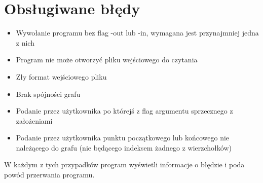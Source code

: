 \documentclass[polish, 12pt, a4paper]{article}
\begin{document}
\section{Obsługiwane błędy}
\begin{itemize}
    \item Wywołanie programu bez flag -out lub -in, wymagana jest przynajmniej jedna z nich
    \item Program nie może otworzyć pliku wejściowego do czytania
    \item Zły format wejściowego pliku
    \item Brak spójności grafu
	\item Podanie przez użytkownika po którejś z flag argumentu sprzecznego z założeniami 
	\item Podanie przez użytkownika punktu początkowego lub końcowego nie należącego do grafu (nie będącego indeksem żadnego z wierzchołków)
\end{itemize}
W każdym z tych przypadków program wyświetli informacje o błędzie i poda powód przerwania programu.
\end{document}
